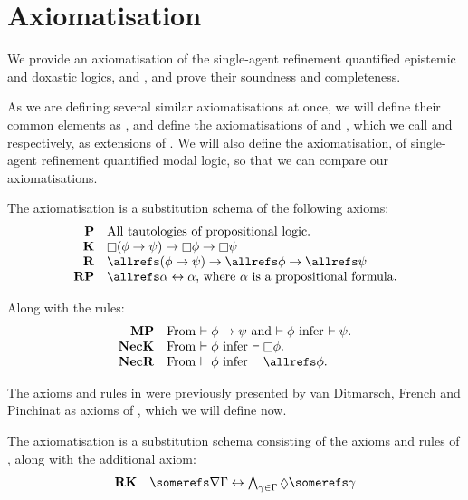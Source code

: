 \section{Axiomatisation}

We provide an axiomatisation of the single-agent refinement quantified epistemic
and doxastic logics, \logicSiF{} and \logicKDiF{}, and prove their soundness
and completeness.

As we are defining several similar axiomatisations at once, we will define their
common elements as \axiomFi{}, and define the axiomatisations of \logicKDiF{}
and \logicSiF{}, which we call \axiomKDiF{} and \axiomSiF{} respectively, as
extensions of \axiomFi{}. We will also define the axiomatisation, \axiomKiF{} of
single-agent refinement quantified modal logic, so that we can compare our
axiomatisations.

\begin{definition}
The axiomatisation \axiomFi{} is a substitution schema of the following axioms:
$$
\begin{array}{rl}
{\bf P} & \text{All tautologies of propositional logic.}\\
{\bf K} & \knows (\phi \implies \psi) \implies \knows \phi \implies \knows \psi\\
{\bf R} & \allrefs (\phi \implies \psi) \implies \allrefs \phi \implies \allrefs \psi\\
{\bf RP} & \allrefs \alpha \iff \alpha \text{, where $\alpha$ is a propositional formula.}\\
\end{array}
$$

Along with the rules:
$$
\begin{array}{rl}
{\bf MP} & \text{From $\proves \phi \implies \psi$ and $\proves \phi$ infer
$\proves \psi$.}\\
{\bf NecK} & \text{From $\proves \phi$ infer $\proves \knows \phi$.}\\
{\bf NecR} & \text{From $\proves \phi$ infer $\proves \allrefs \phi$.}
\end{array}
$$
\end{definition}

The axioms and rules in \axiomFi{} were previously presented by van Ditmarsch,
French and Pinchinat as axioms of \axiomKiF{}, which we will define now.

\begin{definition}
The axiomatisation \axiomKiF{} is a substitution schema consisting of the axioms and rules of \axiomFi{}, along with the additional axiom:
$$
\begin{array}{rl}
{\bf RK} & \somerefs \covers \Gamma \iff \bigwedge_{\gamma \in
\Gamma} \suspects \somerefs \gamma
\end{array}
$$
\end{definition}

